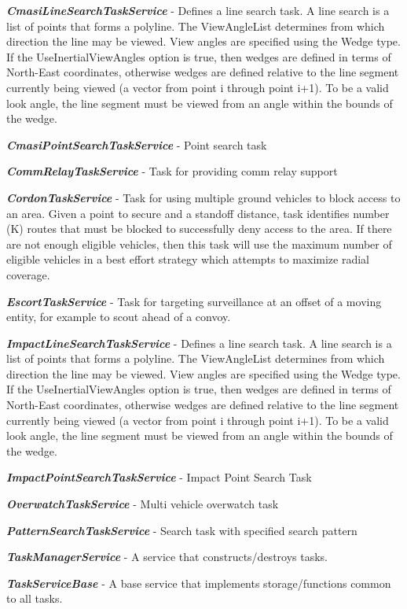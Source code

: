 \textbf{\emph{CmasiLineSearchTaskService}} - Defines a line search task.
A line search is a list of points that forms a polyline. The
ViewAngleList determines from which direction the line may be viewed.
View angles are specified using the Wedge type. If the
UseInertialViewAngles option is true, then wedges are defined in terms
of North-East coordinates, otherwise wedges are defined relative to the
line segment currently being viewed (a vector from point i through point
i+1). To be a valid look angle, the line segment must be viewed from an
angle within the bounds of the wedge.

\textbf{\emph{CmasiPointSearchTaskService}} - Point search task

\textbf{\emph{CommRelayTaskService}} - Task for providing comm relay
support

\textbf{\emph{CordonTaskService}} - Task for using multiple ground
vehicles to block access to an area. Given a point to secure and a
standoff distance, task identifies number (K) routes that must be
blocked to successfully deny access to the area. If there are not enough
eligible vehicles, then this task will use the maximum number of
eligible vehicles in a best effort strategy which attempts to maximize
radial coverage.

\textbf{\emph{EscortTaskService}} - Task for targeting surveillance at
an offset of a moving entity, for example to scout ahead of a convoy.

\textbf{\emph{ImpactLineSearchTaskService}} - Defines a line search
task. A line search is a list of points that forms a polyline. The
ViewAngleList determines from which direction the line may be viewed.
View angles are specified using the Wedge type. If the
UseInertialViewAngles option is true, then wedges are defined in terms
of North-East coordinates, otherwise wedges are defined relative to the
line segment currently being viewed (a vector from point i through point
i+1). To be a valid look angle, the line segment must be viewed from an
angle within the bounds of the wedge.

\textbf{\emph{ImpactPointSearchTaskService}} - Impact Point Search Task

\textbf{\emph{OverwatchTaskService}} - Multi vehicle overwatch task

\textbf{\emph{PatternSearchTaskService}} - Search task with specified
search pattern

\textbf{\emph{TaskManagerService}} - A service that constructs/destroys
tasks.

\textbf{\emph{TaskServiceBase}} - A base service that implements
storage/functions common to all tasks.

